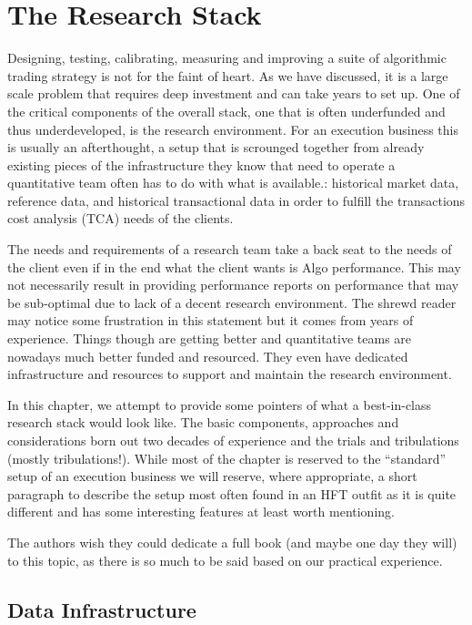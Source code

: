 \chapter{The Research Stack}\label{chap:ch_tech_res}

Designing, testing, calibrating, measuring and improving a suite of algorithmic trading strategy is not for the faint of heart. As we have discussed, it is a large scale problem that requires deep investment and can take years to set up. One of the critical components of the overall stack, one that is often underfunded and thus underdeveloped, is the research environment. For an execution business this is usually an afterthought, a setup that is scrounged together from already existing pieces of the infrastructure they know that need to operate a quantitative team often has to do with what is available.: historical market data, reference data, and historical transactional data in order to fulfill the transactions cost analysis (TCA) needs of the clients.


The needs and requirements of a research team take a back seat to the needs of the client even if in the end what the client wants is Algo performance. This may not necessarily result in providing performance reports on  performance that may be sub-optimal due to lack of a decent research environment. The shrewd reader may notice some frustration in this statement but it comes from years of experience. Things though are getting better and quantitative teams are nowadays much better funded and resourced. They even have dedicated infrastructure and resources to support and maintain the research environment.


In this chapter, we attempt to provide some pointers of what a best-in-class research stack would look like. The basic components, approaches and considerations born out two decades of experience and the trials and tribulations (mostly tribulations!). While most of the chapter is reserved to the ``standard'' setup of an execution business we will reserve, where appropriate, a short paragraph to describe the setup most often found in an HFT outfit as it is quite different and has some interesting features at least worth mentioning.


The authors wish they could dedicate a full book (and maybe one day they will) to this topic, as there is so much to be said based on our practical experience. 



\section{Data Infrastructure}

